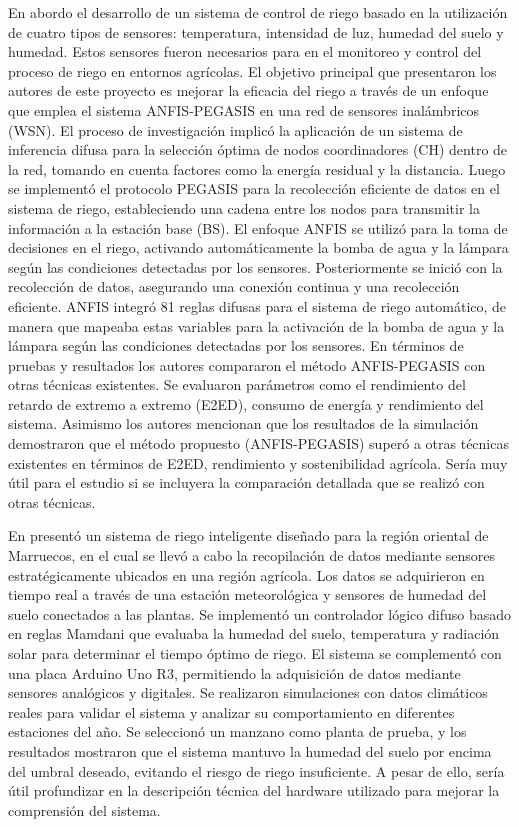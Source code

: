 \bigbreak
En \cite{kumar_irrigation_2020} abordo el desarrollo de un sistema de control de riego basado en la utilización de cuatro tipos de sensores: temperatura, intensidad de luz, humedad del suelo y humedad. Estos sensores fueron necesarios para en el monitoreo y control del proceso de riego en entornos agrícolas. El objetivo principal que presentaron los autores de este proyecto es mejorar la eficacia del riego a través de un enfoque que emplea el sistema ANFIS-PEGASIS en una red de sensores inalámbricos (WSN). El proceso de investigación implicó la aplicación de un sistema de inferencia difusa para la selección óptima de nodos coordinadores (CH) dentro de la red, tomando en cuenta factores como la energía residual y la distancia. Luego se implementó el protocolo PEGASIS para la recolección eficiente de datos en el sistema de riego, estableciendo una cadena entre los nodos para transmitir la información a la estación base (BS). El enfoque ANFIS se utilizó para la toma de decisiones en el riego, activando automáticamente la bomba de agua y la lámpara según las condiciones detectadas por los sensores. Posteriormente se inició con la recolección de datos, asegurando una conexión continua y una recolección eficiente. ANFIS integró 81 reglas difusas para el sistema de riego automático, de manera que mapeaba estas variables para la activación de la bomba de agua y la lámpara según las condiciones detectadas por los sensores. En términos de pruebas y resultados los autores compararon el método ANFIS-PEGASIS con otras técnicas existentes. Se evaluaron parámetros como el rendimiento del retardo de extremo a extremo (E2ED), consumo de energía y rendimiento del sistema. Asimismo los autores mencionan que los resultados de la simulación demostraron que el método propuesto (ANFIS-PEGASIS) superó a otras técnicas existentes en términos de E2ED, rendimiento y sostenibilidad agrícola. Sería muy útil para el estudio si se incluyera la comparación detallada que se realizó con otras técnicas.

\bigbreak
En \cite{mohammed_intelligent_nodate} presentó un sistema de riego inteligente diseñado para la región oriental de Marruecos, en el cual se llevó a cabo la recopilación de datos mediante sensores estratégicamente ubicados en una región agrícola. Los datos se adquirieron en tiempo real a través de una estación meteorológica y sensores de humedad del suelo conectados a las plantas. Se implementó un controlador lógico difuso basado en reglas Mamdani que evaluaba la humedad del suelo, temperatura y radiación solar para determinar el tiempo óptimo de riego. El sistema se complementó con una placa Arduino Uno R3, permitiendo la adquisición de datos mediante sensores analógicos y digitales. Se realizaron simulaciones con datos climáticos reales para validar el sistema y analizar su comportamiento en diferentes estaciones del año. Se seleccionó un manzano como planta de prueba, y los resultados mostraron que el sistema mantuvo la humedad del suelo por encima del umbral deseado, evitando el riesgo de riego insuficiente. A pesar de ello, sería útil profundizar en la descripción técnica del hardware utilizado para mejorar la comprensión del sistema.

